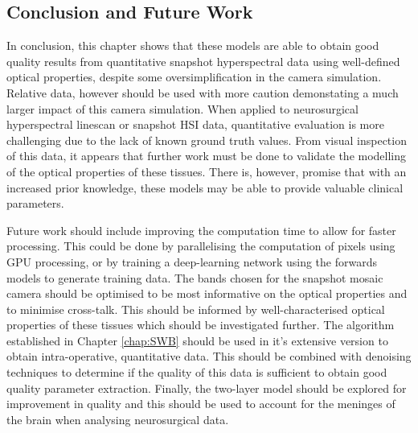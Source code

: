 \subsection{Conclusion and Future Work}
In conclusion, this chapter shows that these models are able to obtain good quality results from quantitative snapshot hyperspectral data using well-defined optical properties, despite some oversimplification in the camera simulation. Relative data, however should be used with more caution demonstating a much larger impact of this camera simulation. When applied to neurosurgical hyperspectral linescan or snapshot HSI data, quantitative evaluation is more challenging due to the lack of known ground truth values. From visual inspection of this data, it appears that further work must be done to validate the modelling of the optical properties of these tissues. There is, however, promise that with an increased prior knowledge, these models may be able to provide valuable clinical parameters. 

Future work should include improving the computation time to allow for faster processing. This could be done by parallelising the computation of pixels using GPU processing, or by training a deep-learning network using the forwards models to generate training data. The bands chosen for the snapshot mosaic camera should be optimised to be most informative on the optical properties and to minimise cross-talk. This should be informed by well-characterised optical properties of these tissues which should be investigated further. The algorithm established in Chapter \ref{chap:SWB} should be used in it's extensive version to obtain intra-operative, quantitative data. This should be combined with denoising techniques to determine if the quality of this data is sufficient to obtain good quality parameter extraction. Finally, the two-layer model should be explored for improvement in quality and this should be used to account for the meninges of the brain when analysing neurosurgical data. 